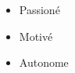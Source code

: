 %
%
%

\twocolumnsection
{
\begin{skills}
\end{skills}}
{
\vspace{1em}
\begin{itemize}
	\item Passioné
	\item Motivé                    
    \item Autonome
\end{itemize}
}
